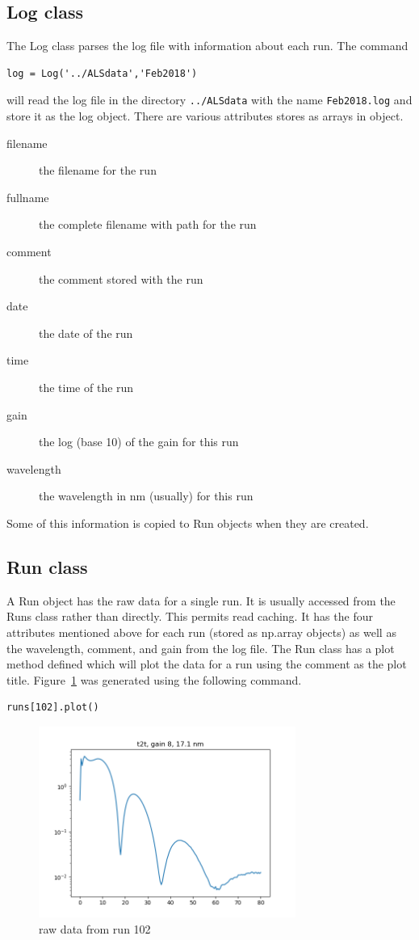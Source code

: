 \documentclass[english]{scrartcl}
\begin{document}
\subsection{Log class}
The Log class parses the log file with information about each run. The command
\begin{lstlisting}
log = Log('../ALSdata','Feb2018')
\end{lstlisting}
will read the log file in the directory \texttt{../ALSdata} with the
name \texttt{Feb2018.log} and store it as the log object. There are various
attributes stores as arrays in object.
\begin{description}
\item[filename] the filename for the run
\item[fullname] the complete filename with path for the run
\item[comment] the comment stored with the run
\item[date] the date of the run
\item[time] the time of the run
\item[gain] the log (base 10) of the gain for this run
\item[wavelength] the wavelength in nm (usually) for this run
\end{description}
Some of this information is copied to Run objects when they are created.
\subsection{Run class}
A Run object has the raw data for a single run. It is usually accessed
from the Runs class rather than directly. This permits read caching. It has the
four attributes mentioned above for each run (stored as np.array objects) as well
as the wavelength, comment, and gain from the log file.
The Run class has a plot method defined which will plot the data for a run
using the comment as the plot title. Figure~\ref{fig:run102} was generated
using the following command.
\begin{lstlisting}
runs[102].plot()
\end{lstlisting}
\begin{figure}[htb]
  \begin{center}
    \includegraphics[width=0.75\textwidth]{images/run102}
  \end{center}
  \caption{\label{fig:run102}raw data from run 102}
\end{figure}
\end{document}
